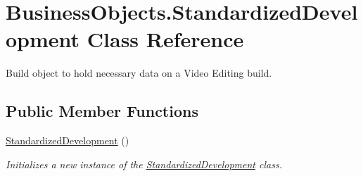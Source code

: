 \hypertarget{class_business_objects_1_1_standardized_development}{}\section{Business\+Objects.\+Standardized\+Development Class Reference}
\label{class_business_objects_1_1_standardized_development}


Build object to hold necessary data on a Video Editing build.  


\subsection*{Public Member Functions}
\begin{DoxyCompactItemize}
\item 
\hyperlink{class_business_objects_1_1_standardized_development_a65a94cd1370b7b2abeb84c38fafc8af4}{Standardized\+Development} ()
\begin{DoxyCompactList}\small\item\em Initializes a new instance of the \hyperlink{class_business_objects_1_1_standardized_development}{Standardized\+Development} class. \end{DoxyCompactList}\end{DoxyCompactItemize}
